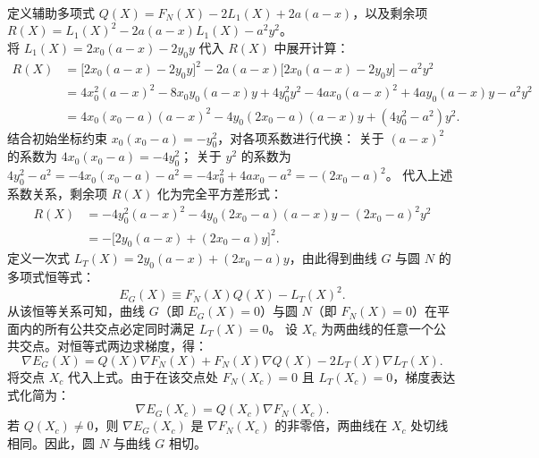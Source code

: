 \begin{solution}
\begin{align*}
\end{align*}
定义辅助多项式 $Q(X) = F_N(X) - 2L_1(X) + 2a(a - x)$，以及剩余项 $R(X) = L_1(X)^2 - 2a(a - x)L_1(X) - a^2 y^2$。\\
将 $L_1(X) = 2x_0(a - x) - 2y_0 y$ 代入 $R(X)$ 中展开计算：
\begin{align*}
R(X) &= \big[2x_0(a - x) - 2y_0 y\big]^2 - 2a(a - x)\big[2x_0(a - x) - 2y_0 y\big] - a^2 y^2 \\
&= 4x_0^2(a - x)^2 - 8x_0 y_0(a - x)y + 4y_0^2 y^2 - 4ax_0(a - x)^2 + 4ay_0(a - x)y - a^2 y^2 \\
&= 4x_0(x_0 - a)(a - x)^2 - 4y_0(2x_0 - a)(a - x)y + (4y_0^2 - a^2)y^2.
\end{align*}
结合初始坐标约束 $x_0(x_0 - a) = -y_0^2$，对各项系数进行代换：
关于 $(a - x)^2$ 的系数为 $4x_0(x_0 - a) = -4y_0^2$；
关于 $y^2$ 的系数为 $4y_0^2 - a^2 = -4x_0(x_0 - a) - a^2 = -4x_0^2 + 4ax_0 - a^2 = -(2x_0 - a)^2$。
代入上述系数关系，剩余项 $R(X)$ 化为完全平方差形式：
\begin{align*}
R(X) &= -4y_0^2(a - x)^2 - 4y_0(2x_0 - a)(a - x)y - (2x_0 - a)^2 y^2 \\
&= -\big[2y_0(a - x) + (2x_0 - a)y\big]^2.
\end{align*}
定义一次式 $L_T(X) = 2y_0(a - x) + (2x_0 - a)y$，由此得到曲线 $G$ 与圆 $N$ 的多项式恒等式：
\[ E_G(X) \equiv F_N(X) Q(X) - L_T(X)^2. \]
从该恒等关系可知，曲线 $G$（即 $E_G(X) = 0$）与圆 $N$（即 $F_N(X) = 0$）在平面内的所有公共交点必定同时满足 $L_T(X) = 0$。
设 $X_c$ 为两曲线的任意一个公共交点。对恒等式两边求梯度，得：
\[ \nabla E_G(X) = Q(X)\nabla F_N(X) + F_N(X)\nabla Q(X) - 2L_T(X)\nabla L_T(X). \]
将交点 $X_c$ 代入上式。由于在该交点处 $F_N(X_c) = 0$ 且 $L_T(X_c) = 0$，梯度表达式化简为：
\[ \nabla E_G(X_c) = Q(X_c)\nabla F_N(X_c). \]
若 $Q(X_c)\neq0$，则 $\nabla E_G(X_c)$ 是 $\nabla F_N(X_c)$ 的非零倍，两曲线在 $X_c$ 处切线相同。因此，圆 $N$ 与曲线 $G$ 相切。
\end{solution}




